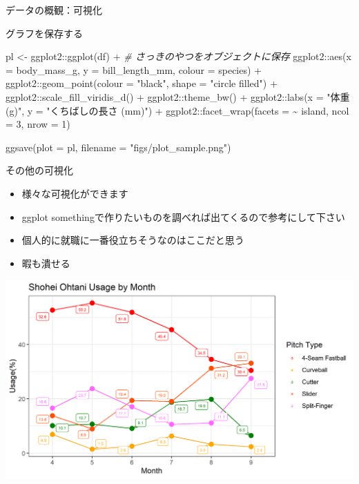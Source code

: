 \documentclass[
  ignorenonframetext,
]{beamer}
\newenvironment{Shaded}{\begin{snugshade}}{\end{snugshade}}
\newcommand{\AttributeTok}[1]{\textcolor[rgb]{0.77,0.63,0.00}{#1}}
\newcommand{\CommentTok}[1]{\textcolor[rgb]{0.56,0.35,0.01}{\textit{#1}}}
\newcommand{\DecValTok}[1]{\textcolor[rgb]{0.00,0.00,0.81}{#1}}
\newcommand{\FunctionTok}[1]{\textcolor[rgb]{0.00,0.00,0.00}{#1}}
\newcommand{\NormalTok}[1]{#1}
\newcommand{\OtherTok}[1]{\textcolor[rgb]{0.56,0.35,0.01}{#1}}
\newcommand{\SpecialCharTok}[1]{\textcolor[rgb]{0.00,0.00,0.00}{#1}}
\newcommand{\StringTok}[1]{\textcolor[rgb]{0.31,0.60,0.02}{#1}}
\providecommand{\tightlist}{%
  \setlength{\itemsep}{0pt}\setlength{\parskip}{0pt}}
\begin{document}
\begin{frame}[fragile]{データの概観：可視化}
\begin{block}{グラフを保存する}
\begin{Shaded}
\begin{Highlighting}[]
\NormalTok{pl }\OtherTok{\textless{}{-}}\NormalTok{ ggplot2}\SpecialCharTok{::}\FunctionTok{ggplot}\NormalTok{(df) }\SpecialCharTok{+} \CommentTok{\# さっきのやつをオブジェクトに保存}
\NormalTok{  ggplot2}\SpecialCharTok{::}\FunctionTok{aes}\NormalTok{(}\AttributeTok{x =}\NormalTok{ body\_mass\_g, }\AttributeTok{y =}\NormalTok{ bill\_length\_mm, }\AttributeTok{colour =}\NormalTok{ species) }\SpecialCharTok{+}
\NormalTok{  ggplot2}\SpecialCharTok{::}\FunctionTok{geom\_point}\NormalTok{(}\AttributeTok{colour =} \StringTok{"black"}\NormalTok{, }\AttributeTok{shape =} \StringTok{"circle filled"}\NormalTok{) }\SpecialCharTok{+}
\NormalTok{  ggplot2}\SpecialCharTok{::}\FunctionTok{scale\_fill\_viridis\_d}\NormalTok{() }\SpecialCharTok{+}
\NormalTok{  ggplot2}\SpecialCharTok{::}\FunctionTok{theme\_bw}\NormalTok{() }\SpecialCharTok{+}
\NormalTok{  ggplot2}\SpecialCharTok{::}\FunctionTok{labs}\NormalTok{(}\AttributeTok{x =} \StringTok{"体重 (g)"}\NormalTok{, }\AttributeTok{y =} \StringTok{"くちばしの長さ (mm)"}\NormalTok{) }\SpecialCharTok{+}
\NormalTok{  ggplot2}\SpecialCharTok{::}\FunctionTok{facet\_wrap}\NormalTok{(}\AttributeTok{facets =} \SpecialCharTok{\textasciitilde{}}\NormalTok{ island, }\AttributeTok{ncol =} \DecValTok{3}\NormalTok{, }\AttributeTok{nrow =} \DecValTok{1}\NormalTok{)}

\FunctionTok{ggsave}\NormalTok{(}\AttributeTok{plot =}\NormalTok{ pl, }\AttributeTok{filename =} \StringTok{"figs/plot\_sample.png"}\NormalTok{)}
\end{Highlighting}
\end{Shaded}
\end{block}

\begin{block}{その他の可視化}
\protect\hypertarget{ux305dux306eux4ed6ux306eux53efux8996ux5316}{}
\begin{itemize}
\tightlist
\item
  様々な可視化ができます
\item
  ggplot somethingで作りたいものを調べれば出てくるので参考にして下さい
\item
  個人的に就職に一番役立ちそうなのはここだと思う
\item
  暇も潰せる
\end{itemize}

\begin{center}\includegraphics[width=0.65\linewidth]{figs/Ohtani_pitch_usage_byMonth} \end{center}
\end{block}
\end{frame}
\end{document}
